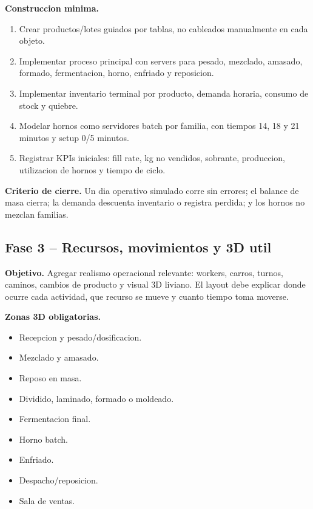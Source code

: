 \documentclass[12pt]{article}
\begin{document}
\textbf{Construccion minima.}
\begin{enumerate}
  \item Crear productos/lotes guiados por tablas, no cableados manualmente en cada objeto.
  \item Implementar proceso principal con servers para pesado, mezclado, amasado, formado, fermentacion, horno, enfriado y reposicion.
  \item Implementar inventario terminal por producto, demanda horaria, consumo de stock y quiebre.
  \item Modelar hornos como servidores batch por familia, con tiempos 14, 18 y 21 minutos y setup 0/5 minutos.
  \item Registrar KPIs iniciales: fill rate, kg no vendidos, sobrante, produccion, utilizacion de hornos y tiempo de ciclo.
\end{enumerate}

\textbf{Criterio de cierre.} Un dia operativo simulado corre sin errores; el balance de masa cierra; la demanda descuenta inventario o registra perdida; y los hornos no mezclan familias.

\subsection{Fase 3 -- Recursos, movimientos y 3D util}

\textbf{Objetivo.} Agregar realismo operacional relevante: workers, carros, turnos, caminos, cambios de producto y visual 3D liviano. El layout debe explicar donde ocurre cada actividad, que recurso se mueve y cuanto tiempo toma moverse.

\textbf{Zonas 3D obligatorias.}
\begin{itemize}
  \item Recepcion y pesado/dosificacion.
  \item Mezclado y amasado.
  \item Reposo en masa.
  \item Dividido, laminado, formado o moldeado.
  \item Fermentacion final.
  \item Horno batch.
  \item Enfriado.
  \item Despacho/reposicion.
  \item Sala de ventas.
\end{itemize}
\end{document}
